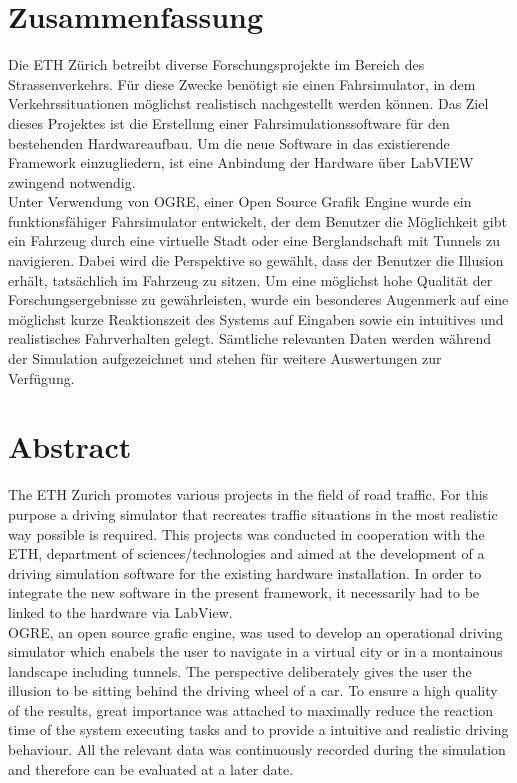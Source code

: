 \section*{Zusammenfassung}
Die ETH Zürich betreibt diverse Forschungsprojekte im Bereich des Strassenverkehrs. Für diese Zwecke benötigt sie einen Fahrsimulator, in dem Verkehrssituationen möglichst realistisch nachgestellt werden können. Das Ziel dieses Projektes ist die Erstellung einer Fahrsimulationssoftware für den bestehenden Hardwareaufbau. Um die neue Software in das existierende Framework einzugliedern, ist eine Anbindung der Hardware über LabVIEW zwingend notwendig.\\
Unter Verwendung von OGRE, einer Open Source Grafik Engine wurde ein funktionsfähiger Fahrsimulator entwickelt, der dem Benutzer die Möglichkeit gibt ein Fahrzeug durch eine virtuelle Stadt oder eine Berglandschaft mit Tunnels zu navigieren. Dabei wird die Perspektive so gewählt, dass der Benutzer die Illusion erhält, tatsächlich im Fahrzeug zu sitzen.
Um eine möglichst hohe Qualität der Forschungsergebnisse zu gewährleisten, wurde ein besonderes Augenmerk auf eine möglichst kurze Reaktionszeit des Systems auf Eingaben sowie ein intuitives und realistisches Fahrverhalten gelegt.
Sämtliche relevanten Daten werden während der Simulation aufgezeichnet und stehen für weitere Auswertungen zur Verfügung.
\newpage
\thispagestyle{empty}
\hspace{1cm}
\newpage
\section*{Abstract}
The ETH Zurich promotes various  projects in the field of road traffic. For this purpose a driving simulator that recreates traffic situations in the most realistic way possible is required. This projects was conducted in cooperation with the ETH, department of sciences/technologies and aimed at the development of a driving simulation software for the existing hardware installation. In order to integrate the new software in the present framework, it necessarily had to be linked to the hardware via LabView. \\
OGRE, an open source grafic engine, was used to develop an operational driving simulator which enabels the user to navigate in a virtual city or in a montainous landscape including tunnels. The perspective deliberately gives the user the illusion to be sitting behind the driving wheel of a car. To ensure a high quality of the results, great importance was attached to maximally reduce the reaction time of the system executing tasks and to provide a intuitive and realistic driving behaviour. All the relevant data was continuously recorded during the simulation and therefore can be evaluated at a later date.
\newpage
\thispagestyle{empty}
\hspace{1cm}
\newpage
